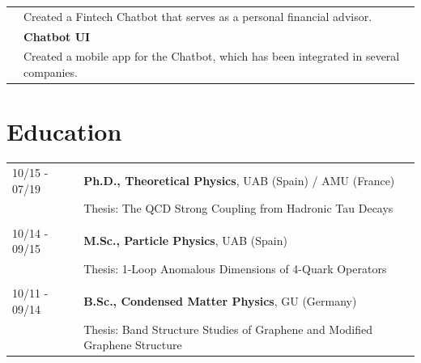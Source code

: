 \documentclass[11pt]{article}
\begin{document}
\begin{minipage}[t]{0.65\textwidth}
\begin{tabularx}{\textwidth}{lX}
                & \small Created a Fintech Chatbot that serves as a personal financial
                  advisor.\\
                & \small \textbf{Chatbot UI} \\
                & \small Created a mobile app for the Chatbot, which has been
                  integrated in several companies.
\end{tabularx}

\vspace{0.3cm}

\section*{Education}
\begin{small}
\begin{tabularx}{\textwidth}{lX}
  10/15 - 07/19 & \textbf{Ph.D., Theoretical Physics}, UAB (Spain) / AMU (France) \\
                & Thesis: The QCD Strong Coupling from Hadronic Tau
                  Decays \\\\
  10/14 - 09/15 & \textbf{M.Sc., Particle Physics}, UAB (Spain) \\
                & Thesis: 1-Loop Anomalous Dimensions of 4-Quark
                  Operators \\\\
  10/11 - 09/14 & \textbf{B.Sc., Condensed Matter Physics}, GU (Germany) \\
                & Thesis: Band Structure Studies of Graphene and Modified
                  Graphene Structure
\end{tabularx}
\end{small}


\end{minipage}
\end{document}
